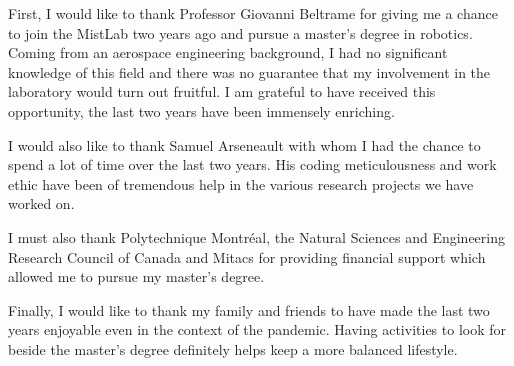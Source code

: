 %
%

First, I would like to thank Professor Giovanni Beltrame for giving me a chance to join the MistLab two years ago and pursue a master's degree in robotics. Coming from an aerospace engineering background, I had no significant knowledge of this field and there was no guarantee that my involvement in the laboratory would turn out fruitful. I am grateful to have received this opportunity, the last two years have been immensely enriching.

I would also like to thank Samuel Arseneault with whom I had the chance to spend a lot of time over the last two years. His coding meticulousness and work ethic have been of tremendous help in the various research projects we have worked on.

I must also thank Polytechnique Montréal, the Natural Sciences and Engineering Research Council of Canada and Mitacs for providing financial support which allowed me to pursue my master's degree.

Finally, I would like to thank my family and friends to have made the last two years enjoyable even in the context of the pandemic. Having activities to look for beside the master's degree definitely helps keep a more balanced lifestyle.
